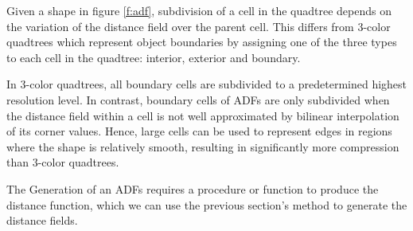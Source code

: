 Given a shape in figure \ref{f:adf}, subdivision of a cell in the quadtree depends on the variation of the distance field over the parent cell. This differs from 3-color quadtrees which represent object boundaries by assigning one of the three types to each cell in the quadtree: interior, exterior and boundary. 

In 3-color quadtrees, all boundary cells are subdivided to a predetermined highest resolution level. In contrast, boundary cells of ADFs are only subdivided when the distance field within a cell is not well approximated by bilinear interpolation of its corner values. Hence, large cells can be used to represent edges in regions where the shape is relatively smooth, resulting in significantly more compression than 3-color quadtrees.

The Generation of an ADFs requires a procedure or function to produce the distance function, which we can use the previous section's method to generate the distance fields.    

